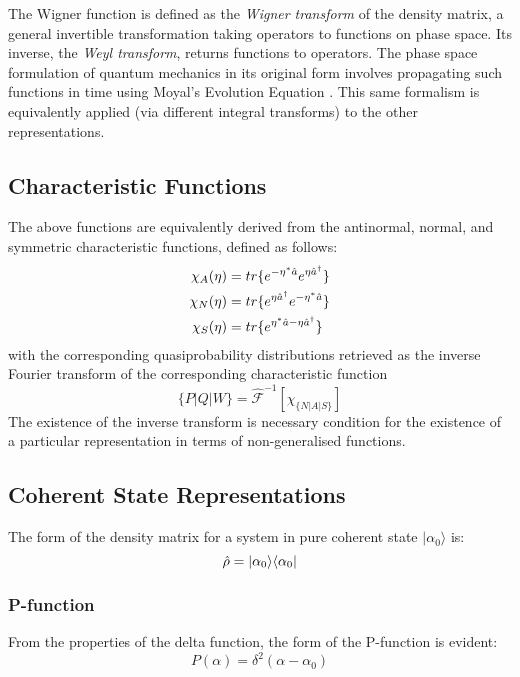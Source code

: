 The Wigner function is defined as the \emph{Wigner transform} of the density matrix, a general invertible transformation taking operators to functions on phase space. Its inverse, the \emph{Weyl transform}, returns functions to operators. The phase space formulation of quantum mechanics in its original form involves propagating such functions in time using Moyal's Evolution Equation \autocite{Curtright2011}. This same formalism is equivalently applied (via different integral transforms) to the other representations.

\subsection{Characteristic Functions}

The above functions are equivalently derived from the antinormal, normal, and symmetric characteristic functions, defined as follows:
\begin{align}
	\chi_{A} (\eta) &= tr\{e^{-\eta^* \hat{a}}e^{\eta \hat{a}^\dagger } \} \\
	\chi_{N} (\eta) &= tr\{e^{\eta \hat{a}^\dagger}e^{-\eta^* \hat{a} } \} \\
	\chi_{S} (\eta) &= tr\{e^{\eta^* \hat{a}-\eta \hat{a}^\dagger } \} 
\end{align}
with the corresponding quasiprobability distributions retrieved as the inverse Fourier transform of the corresponding characteristic function
 \begin{equation}
 	\{P|Q|W\} = \hat{\mathscr{F}}^{-1} [\chi_{\{N|A|S\}}]
\end{equation}
The existence of the inverse transform is necessary condition for the existence of a particular representation in terms of non-generalised functions. 

\subsection{Coherent State Representations}

The form of the density matrix for a system in pure coherent state $ | \alpha_0 \rangle $  is:
\begin{equation}
 	\hat{\rho} = | \alpha_0 \rangle \langle \alpha_0 | 
 \end{equation}
 \subsubsection{P-function}
 From the properties of the delta function, the form of the P-function is evident:
\begin{equation}
	P(\alpha) = \delta^2(\alpha-\alpha_0)
\end{equation}
